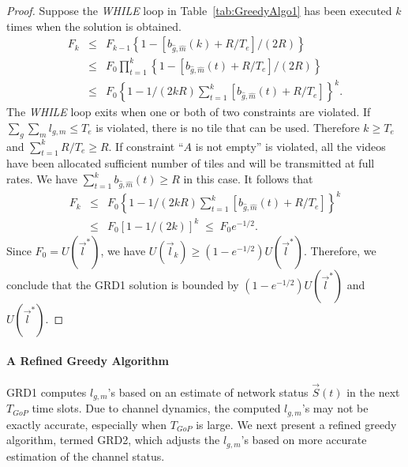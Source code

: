 \documentclass[12pt,onecolumn,draftclsnofoot]{IEEEtran} %
\begin{document}
\begin{proof}
Suppose the {\em WHILE} loop in Table~\ref{tab:GreedyAlgo1} has been executed $k$ times when the solution is obtained. 
\begin{eqnarray}
F_k &\le& F_{k-1} \left\{ 1-\left[b_{\hat{g},\hat{m}}(k)+R/T_e\right] / (2R) \right\} \nonumber \\
& \le & F_0 \prod_{t=1}^k \left\{ 1 - \left[ b_{\hat{g},\hat{m}}(t)+R/T_e \right] / (2R) \right\} \nonumber \\
&\le& F_0 \left\{ 1 - 1/(2kR) \sum_{t=1}^k [ b_{\hat{g},\hat{m}}(t)+R/T_e ] \right\}^k. \nonumber
\end{eqnarray}
The {\em WHILE} loop exits when one or both of two constraints are violated. If $\sum_{g}\sum_{m} l_{g,m} \le T_e$ is violated, there is no tile that can be used. Therefore $k \ge T_e$ and $\sum_{t=1}^kR/T_e\ge R$. If constraint ``$A$ is not empty'' is violated, all the videos have been allocated sufficient number of tiles and will be transmitted at full rates. We have $\sum_{t=1}^k b_{\hat{g},\hat{m}}(t) \geq R$ in this case.  It follows that
\begin{eqnarray}
F_k &\le& 
F_0 \left\{ 1 - 1/(2kR) \sum_{t=1}^k [ b_{\hat{g},\hat{m}}(t)+R/T_e ] \right\}^k \nonumber \\
& \le & F_0 \left[ 1 - 1/(2k) \right]^k \; \le \; F_0 e^{-1/2}. \nonumber %
\end{eqnarray}
Since $F_0=U(\vec{l}^{\ast})$, we have $U(\vec{l}_k)\ge(1-e^{-1/2})U(\vec{l}^{\ast})$.  Therefore, we conclude that the GRD1 solution is bounded by $(1-e^{-1/2})U(\vec{l}^{\ast})$ and $U(\vec{l}^{\ast})$.
\end{proof}


\paragraph{A Refined Greedy Algorithm \label{subsubsec:ga2}}

GRD1 computes $l_{g,m}$'s based on an estimate of network status $\vec{S}(t)$ in the next $T_{GoP}$ time slots.  Due to channel dynamics, the computed $l_{g,m}$'s may not be exactly accurate, especially when $T_{GoP}$ is large.  We next present a refined greedy algorithm, termed GRD2, which adjusts the $l_{g,m}$'s based on more accurate estimation of the channel status.
\end{document}
